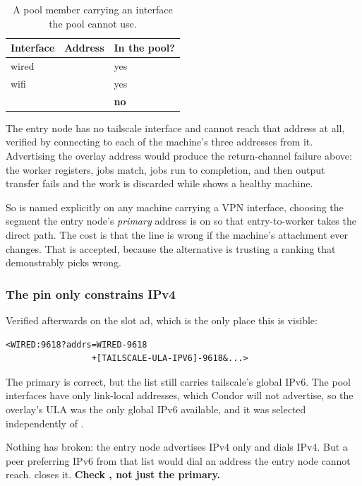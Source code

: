 \begin{table}[H]
\centering
\begin{tabularx}{\textwidth}{L{0.22\textwidth} L{0.26\textwidth} Y}
\toprule
\textbf{Interface} & \textbf{Address} & \textbf{In the pool?} \\
\midrule
wired &  & yes \\
wifi &  & yes \\
 &  & \textbf{no} \\
\bottomrule
\end{tabularx}
\caption{A pool member carrying an interface the pool cannot use.}
\end{table}

The entry node has no tailscale interface and cannot reach that address at all,
verified by connecting to each of the machine's three addresses from it.
Advertising the overlay address would produce the return-channel failure above:
the worker registers, jobs match, jobs run to completion, and then output
transfer fails and the work is discarded while  shows a
healthy machine.

So  is named explicitly on any machine carrying a VPN
interface, choosing the segment the entry node's \emph{primary} address is on so
that entry-to-worker takes the direct path. The cost is that the line is wrong
if the machine's attachment ever changes. That is accepted, because the
alternative is trusting a ranking that demonstrably picks wrong.

\subsubsection{The pin only constrains IPv4}

Verified afterwards on the slot ad, which is the only place this is visible:

\begin{lstlisting}[style=term]
<WIRED:9618?addrs=WIRED-9618
                 +[TAILSCALE-ULA-IPV6]-9618&...>
\end{lstlisting}

The primary is correct, but the  list still carries tailscale's
global IPv6. The pool interfaces have only link-local  addresses,
which Condor will not advertise, so the overlay's ULA was the only global IPv6
available, and it was selected independently of .

\begin{keypoint}
Nothing has broken: the entry node advertises IPv4 only and dials IPv4. But a
peer preferring IPv6 from that list would dial an address the entry node cannot
reach.  closes it. \textbf{Check , not
just the primary.}
\end{keypoint}


